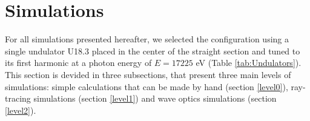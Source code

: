 \documentclass{iucr}              %
\newcommand{\todo}[1]{{\color{red}[TODO: "#1'']}}
\begin{document}
\begin{table}\label{tab:eBeam}
    \centering
    \caption{ESRF and EBS main electron beam parameters. Electron beam parameters for the high-$\beta$ (ESRF) and the EBS straight sections. Values taken at the symmetry point of the straight section, where the insertion devices are placed. Values for ESRF are taken from \cite{ESRF2014}. For EBS, two (very close) design values are used, from Ref.~\cite{ESRF2014} labelled EBS-S28A, and those coming from further lattice refinement, labelled EBS-S28D. \todo{Remove ESRF-AT and EBS-S28A} }
\end{table}

\section{Simulations}
\label{Simulations}

For all simulations presented hereafter, we selected the configuration using a single undulator U18.3 placed in the center of the straight section and tuned to its first harmonic at a photon energy of $E=17225$ eV (Table \ref{tab:Undulators}). This section is devided in three subsections, that present three main levels of simulations: simple calculations that can be made by hand (section \ref{level0}), ray-tracing simulations (section \ref{level1}) and wave optics simulations (section \ref{level2}).   
\end{document}
